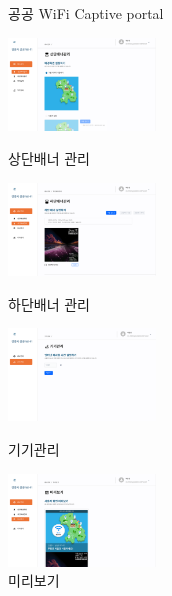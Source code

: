 \begin{itemize}[label=]
\begin{itemize}[label=]
\begin{figure}[!ht]
\begin{fullwidth}
{					            \caption*{공공 WiFi Captive portal}
				            }
			            \end{fullwidth}
		            \end{figure}
	      \end{itemize}
	      \begin{figure}[!ht]
		      \begin{fullwidth}
			      \parbox{0.35\textwidth}{
				      \centering
				      \includegraphics[width=0.35\textwidth]{images/public-ad-fi-upper-banner.png}
				      \caption*{상단배너 관리}
			      }\qquad
			      \parbox{0.35\textwidth}{
				      \centering
				      \includegraphics[width=0.35\textwidth]{images/public-ad-fi-lower-banner.png}
				      \caption*{하단배너 관리}
			      }\qquad
			      \parbox{0.35\textwidth}{
				      \centering
				      \includegraphics[width=0.35\textwidth]{images/public-ad-fi-device-manage.png}
				      \caption*{기기관리}
			      }\qquad
			      \parbox{0.35\textwidth}{
				      \centering
				      \includegraphics[width=0.35\textwidth]{images/public-ad-fi-preview.png}
				      \caption*{미리보기}
			      }
		      \end{fullwidth}
	      \end{figure}

\end{itemize}

